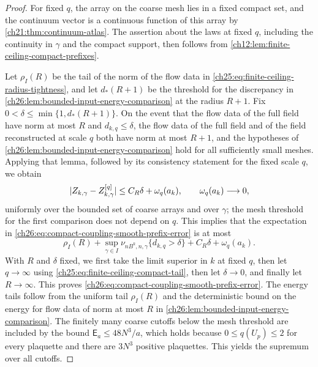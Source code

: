\begin{proof}
For fixed $q$, the array on the coarse mesh lies in a fixed compact set, and the continuum vector is a continuous function of this array by \cref{ch21:thm:continuum-atlas}. The assertion about the laws at fixed $q$, including the continuity in $\gamma$ and the compact support, then follows from \cref{ch12:lem:finite-ceiling-compact-prefixes}.

Let $\rho_I(R)$ be the tail of the norm of the flow data in \eqref{ch25:eq:finite-ceiling-radius-tightness}, and let $d_*(R+1)$ be the threshold for the discrepancy in \cref{ch26:lem:bounded-input-energy-comparison} at the radius $R+1$. Fix $0<\delta\le\min\{1,d_*(R+1)\}$. On the event that the flow data of the full field have norm at most $R$ and $d_{k,q}\le\delta$, the flow data of the full field and of the field reconstructed at scale $q$ both have norm at most $R+1$, and the hypotheses of \cref{ch26:lem:bounded-input-energy-comparison} hold for all sufficiently small meshes. Applying that lemma, followed by its consistency statement for the fixed scale $q$, we obtain
\[
 \lvert Z_{k,\gamma}-Z^{[q]}_{k,\gamma}\rvert\le C_R\delta+\omega_q(a_k),\qquad\omega_q(a_k)\longrightarrow0,
\]
uniformly over the bounded set of coarse arrays and over $\gamma$; the mesh threshold for the first comparison does not depend on $q$. This implies that the expectation in \eqref{ch26:eq:compact-coupling-smooth-prefix-error} is at most
\[
 \rho_I(R)+\sup_{\gamma\in I}\nu_{nB^k,n,\gamma}\{d_{k,q}>\delta\}+C_R\delta+\omega_q(a_k).
\]
With $R$ and $\delta$ fixed, we first take the limit superior in $k$ at fixed $q$, then let $q\to\infty$ using \eqref{ch25:eq:finite-ceiling-compact-tail}, then let $\delta\to0$, and finally let $R\to\infty$. This proves \eqref{ch26:eq:compact-coupling-smooth-prefix-error}. The energy tails follow from the uniform tail $\rho_I(R)$ and the deterministic bound on the energy for flow data of norm at most $R$ in \cref{ch26:lem:bounded-input-energy-comparison}. The finitely many coarse cutoffs below the mesh threshold are included by the bound $\mathsf E_a\le48N^3/a$, which holds because $0\le q(U_p)\le2$ for every plaquette and there are $3N^3$ positive plaquettes. This yields the supremum over all cutoffs.
\end{proof}

